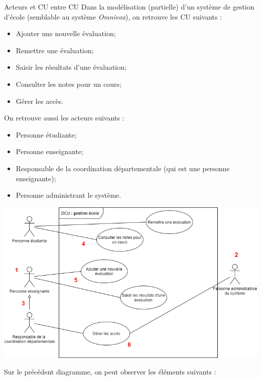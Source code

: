 \begin{exemple}[label={ex:acteurs-cu}]{Acteurs et CU entre \acrshort{CU}}
	Dans la modélisation (partielle) d'un système de gestion d'école (semblable au système {\itshape Omnivox}), on retrouve les CU suivants :
	\begin{itemize}
		\item Ajouter une nouvelle évaluation;
		\item Remettre une évaluation;
		\item Saisir les résultats d'une évaluation;
		\item Consulter les notes pour un cours;
		\item Gérer les accès.
	\end{itemize}
	On retrouve aussi les acteurs suivants :
	\begin{itemize}
		\item Personne étudiante;
		\item Personne enseignante;
		\item Responsable de la coordination départementale (qui est une personne enseignante);
		\item Personne administrant le système.
	\end{itemize}
	
	\begin{center} 
		\includegraphics[width=.95\textwidth]{cas-utilisation-Exemple acteurs et CU.drawio.png}
	\end{center}
	
	Sur le précédent diagramme, on peut observer les éléments suivants :
	

\end{exemple}
